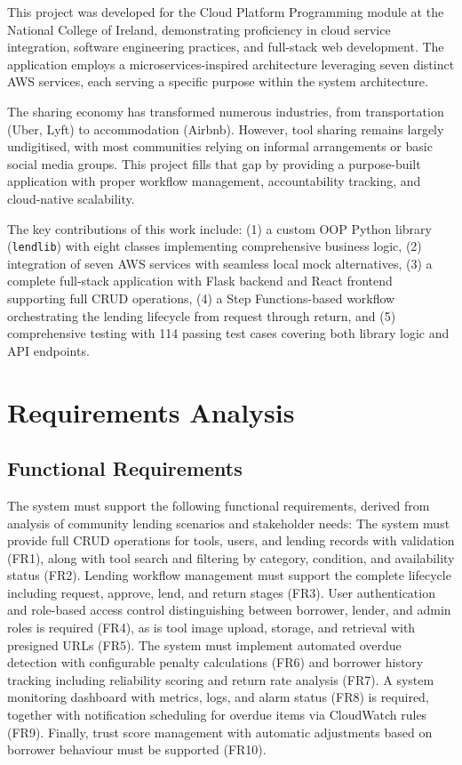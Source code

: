 \documentclass[conference]{IEEEtran}
\begin{document}
This project was developed for the Cloud Platform Programming module at the National College of Ireland, demonstrating proficiency in cloud service integration, software engineering practices, and full-stack web development. The application employs a microservices-inspired architecture leveraging seven distinct AWS services, each serving a specific purpose within the system architecture.

The sharing economy has transformed numerous industries, from transportation (Uber, Lyft) to accommodation (Airbnb). However, tool sharing remains largely undigitised, with most communities relying on informal arrangements or basic social media groups. This project fills that gap by providing a purpose-built application with proper workflow management, accountability tracking, and cloud-native scalability.

The key contributions of this work include: (1) a custom OOP Python library (\texttt{lendlib}) with eight classes implementing comprehensive business logic, (2) integration of seven AWS services with seamless local mock alternatives, (3) a complete full-stack application with Flask backend and React frontend supporting full CRUD operations, (4) a Step Functions-based workflow orchestrating the lending lifecycle from request through return, and (5) comprehensive testing with 114 passing test cases covering both library logic and API endpoints.

\section{Requirements Analysis}

\subsection{Functional Requirements}
The system must support the following functional requirements, derived from analysis of community lending scenarios and stakeholder needs:
The system must provide full CRUD operations for tools, users, and lending records with validation (FR1), along with tool search and filtering by category, condition, and availability status (FR2). Lending workflow management must support the complete lifecycle including request, approve, lend, and return stages (FR3). User authentication and role-based access control distinguishing between borrower, lender, and admin roles is required (FR4), as is tool image upload, storage, and retrieval with presigned URLs (FR5). The system must implement automated overdue detection with configurable penalty calculations (FR6) and borrower history tracking including reliability scoring and return rate analysis (FR7). A system monitoring dashboard with metrics, logs, and alarm status (FR8) is required, together with notification scheduling for overdue items via CloudWatch rules (FR9). Finally, trust score management with automatic adjustments based on borrower behaviour must be supported (FR10).
\end{document}
